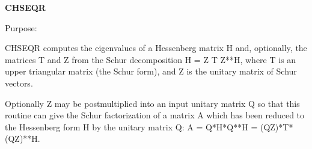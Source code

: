 {\bfseries C\+H\+S\+E\+Q\+R} 

 \begin{DoxyParagraph}{Purpose\+: }
\begin{DoxyVerb}    CHSEQR computes the eigenvalues of a Hessenberg matrix H
    and, optionally, the matrices T and Z from the Schur decomposition
    H = Z T Z**H, where T is an upper triangular matrix (the
    Schur form), and Z is the unitary matrix of Schur vectors.

    Optionally Z may be postmultiplied into an input unitary
    matrix Q so that this routine can give the Schur factorization
    of a matrix A which has been reduced to the Hessenberg form H
    by the unitary matrix Q:  A = Q*H*Q**H = (QZ)*T*(QZ)**H.\end{DoxyVerb}
 
\end{DoxyParagraph}


